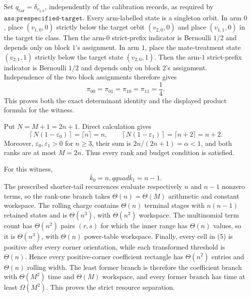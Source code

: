 Set \(q_{\mathrm{tar}}=\delta_{v_{2,0}}\), independently of the calibration records, as required by \(\texttt{ass:prespecified-target}\). Every arm-labelled state is a singleton orbit. In arm \(0\), place \((v_{1,0},0)\) strictly below the target orbit \((v_{2,0},0)\) and place \((v_{1,1},0)\) in the target tie class. Then the arm-\(0\) strict-prefix indicator is Bernoulli \(1/2\) and depends only on block \(1\)'s assignment. In arm \(1\), place the mate-treatment state \((v_{2,1},1)\) strictly below the target state \((v_{2,0},1)\). Then the arm-\(1\) strict-prefix indicator is Bernoulli \(1/2\) and depends only on block \(2\)'s assignment. Independence of the two block assignments therefore gives
\[
\pi_{00}=\pi_{01}=\pi_{10}=\pi_{11}=\frac14.
\tag{5}
\]
This proves both the exact determinant identity and the displayed product formula for the witness.

Put \(N=M+1=2n+1\). Direct calculation gives
\[
\left\lceil N(1-\varepsilon_0)\right\rceil
=\lceil n\rceil=n,
\qquad
\left\lceil N(1-\varepsilon_1)\right\rceil
=\lceil n+2\rceil=n+2.
\tag{6}
\]
Moreover, \(\varepsilon_0,\varepsilon_1>0\) for \(n\ge3\), their sum is \(2n/(2n+1)=\alpha<1\), and both ranks are at most \(M=2n\). Thus every rank and budget condition is satisfied.

For this witness,
\[
\bar k_0=n,qquad \bar k_1=n-1.
\tag{7}
\]
The prescribed shorter-tail recurrences evaluate respectively \(n\) and \(n-1\) nonzero terms, so the rank-one branch takes \(\Theta(n)=\Theta(M)\) arithmetic and constant workspace. The rolling charge contains \(\Theta(n)\) terminal stages with \(n(n-1)\) retained states and is \(\Theta(n^3)\), with \(\Theta(n^2)\) workspace. The multinomial term count has \(\Theta(n^2)\) pairs \((r,s)\) for which the inner range has \(\Theta(n)\) values, so it is \(\Theta(n^3)\), with \(\Theta(n)\) power-table workspace. Finally, every cell in (5) is positive after every corner orientation, while each transformed threshold is \(\Theta(n)\). Hence every positive-corner coefficient rectangle has \(\Theta(n^2)\) entries and \(\Theta(n)\) rolling width. The least former branch is therefore the coefficient branch with \(\Theta(M^2)\) time and \(\Theta(M)\) workspace, and every former branch has time at least \(\Omega(M^2)\). This proves the strict resource separation.
